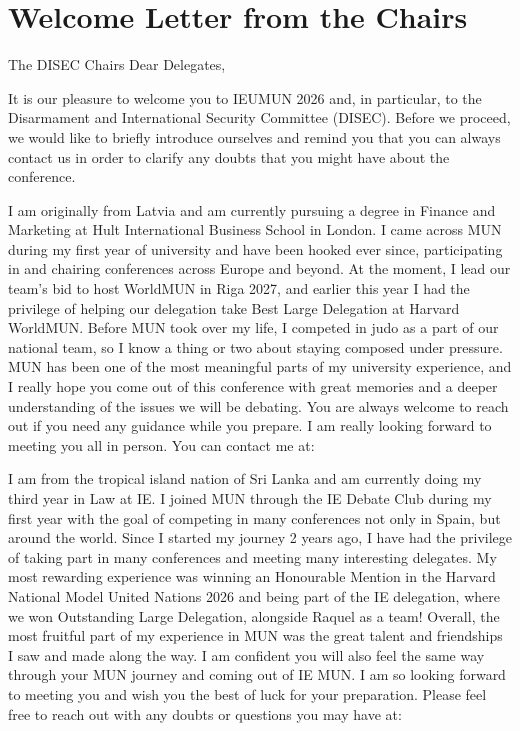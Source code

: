 \section{Welcome Letter from the Chairs}

\begin{chairletter}{The DISEC Chairs}
Dear Delegates,

It is our pleasure to welcome you to IEUMUN 2026 and, in particular, to the Disarmament and International Security Committee (DISEC). Before we proceed, we would like to briefly introduce ourselves and remind you that you can always contact us in order to clarify any doubts that you might have about the conference.


I am originally from Latvia and am currently pursuing a degree in Finance and Marketing at Hult International Business School in London. I came across MUN during my first year of university and have been hooked ever since, participating in and chairing conferences across Europe and beyond. At the moment, I lead our team's bid to host WorldMUN in Riga 2027, and earlier this year I had the privilege of helping our delegation take Best Large Delegation at Harvard WorldMUN. Before MUN took over my life, I competed in judo as a part of our national team, so I know a thing or two about staying composed under pressure. MUN has been one of the most meaningful parts of my university experience, and I really hope you come out of this conference with great memories and a deeper understanding of the issues we will be debating. You are always welcome to reach out if you need any guidance while you prepare. I am really looking forward to meeting you all in person. You can contact me at: 


I am from the tropical island nation of Sri Lanka and am currently doing my third year in Law at IE. I joined MUN through the IE Debate Club during my first year with the goal of competing in many conferences not only in Spain, but around the world. Since I started my journey 2 years ago, I have had the privilege of taking part in many conferences and meeting many interesting delegates. My most rewarding experience was winning an Honourable Mention in the Harvard National Model United Nations 2026 and being part of the IE delegation, where we won Outstanding Large Delegation, alongside Raquel as a team! Overall, the most fruitful part of my experience in MUN was the great talent and friendships I saw and made along the way. I am confident you will also feel the same way through your MUN journey and coming out of IE MUN. I am so looking forward to meeting you and wish you the best of luck for your preparation. Please feel free to reach out with any doubts or questions you may have at: 


\end{chairletter}

